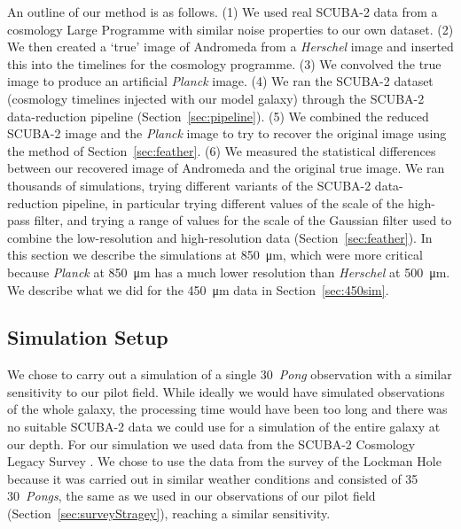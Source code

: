 \documentclass[a4paper,fleqn,usenatbib, twocolumn]{aastex63}
\begin{document}
An outline of our method is as follows. (1) We used real SCUBA-2 data from a cosmology Large Programme with similar noise properties to our own dataset. (2) We then created a `true' image of Andromeda from a {\it Herschel} image and inserted this into the timelines for the cosmology programme. (3) We convolved the true image to produce an artificial {\it Planck} image. (4) We ran the SCUBA-2 dataset (cosmology timelines injected with our model galaxy)
through the SCUBA-2 data-reduction pipeline (Section~\ref{sec:pipeline}). (5) We combined 
the reduced SCUBA-2 image and the {\it Planck} image to try to recover the
original image using the method of Section~\ref{sec:feather}.
(6) We measured the statistical differences between our recovered image of Andromeda
and the original true image. We ran thousands of simulations, trying different variants of
the SCUBA-2 data-reduction pipeline, in particular trying different values of the
scale of the high-pass filter, and trying a range of values for the scale of the Gaussian
filter used to combine the low-resolution and high-resolution data (Section~\ref{sec:feather}).
In this section we describe the simulations at \SI{850}{\micro\meter}, which were more critical
because {\it Planck} at  \SI{850}{\micro\meter} has a much lower resolution than
{\it Herschel} at  \SI{500}{\micro\meter}. We describe what we did for the  \SI{450}{\micro\meter} data
in Section~\ref{sec:450sim}.

\subsection{Simulation Setup}

We chose to carry out a simulation of a single 30\arcmin\ {\it Pong} observation
with a similar sensitivity to our pilot field. While ideally we would have
simulated observations of the whole galaxy, the processing time would have been too
long and there was no suitable SCUBA-2 data we could use for a simulation of
the entire galaxy at our depth. For our simulation we used data from the SCUBA-2 Cosmology Legacy Survey \citep{geach2017}. We chose to use the data from the survey of the Lockman
Hole because it was carried out in similar weather conditions and
consisted of 35 30\arcmin\ {\it Pongs}, the same as we used in our observations of our pilot field (Section~\ref{sec:surveyStragey}), reaching a similar sensitivity.
\end{document}
